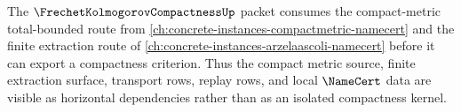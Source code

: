 The $\FrechetKolmogorovCompactnessUp$ packet consumes the compact-metric total-bounded route from \autoref{ch:concrete-instances-compactmetric-namecert} and the finite extraction route of \autoref{ch:concrete-instances-arzelaascoli-namecert} before it can export a compactness criterion. Thus the compact metric source, finite extraction surface, transport rows, replay rows, and local $\NameCert$ data are visible as horizontal dependencies rather than as an isolated compactness kernel.
